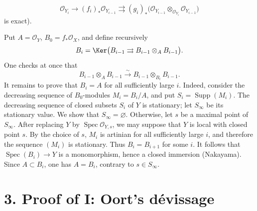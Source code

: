 \[
  \mathcal O_{Y_i}\longrightarrow(f_i)_*\mathcal O_{Y_{i-1}}
  \rightrightarrows
  (g_i)_*\bigl(
    \mathcal O_{Y_{i-1}}\otimes_{\mathcal O_{Y_i}}
    \mathcal O_{Y_{i-1}}
  \bigr)
\]
is exact).

Put $A=\mathcal O_Y$, $B_0=f_*\mathcal O_X$, and define recursively
\[
  B_i=\Ker\bigl(
    B_{i-1}\rightrightarrows B_{i-1}\otimes_A B_{i-1}
  \bigr).
\]
One checks at once that
\[
  B_{i-1}\otimes_A B_{i-1}
  \xrightarrow{\sim}
  B_{i-1}\otimes_{B_i}B_{i-1}.
\]
It remains to prove that $B_i=A$ for all sufficiently large $i$. Indeed,
consider the decreasing sequence of $B_0$-modules $M_i=B_i/A$, and put
$S_i=\operatorname{Supp}(M_i)$. The decreasing sequence of closed subsets $S_i$ of $Y$
is stationary; let $S_\infty$ be its stationary value. We show that
$S_\infty=\varnothing$. Otherwise, let $s$ be a maximal point of
$S_\infty$. After replacing $Y$ by $\operatorname{Spec}\mathcal O_{Y,s}$, we may suppose
that $Y$ is local with closed point $s$. By the choice of $s$, $M_i$ is
artinian for all sufficiently large $i$, and therefore the sequence $(M_i)$
is stationary. Thus $B_i=B_{i+1}$ for some $i$. It follows that
$\operatorname{Spec}(B_i)\to Y$ is a monomorphism, hence a closed immersion (Nakayama).
Since $A\subset B_i$, one has $A=B_i$, contrary to $s\in S_\infty$.

\section*{3. Proof of I: Oort's d\'evissage}


